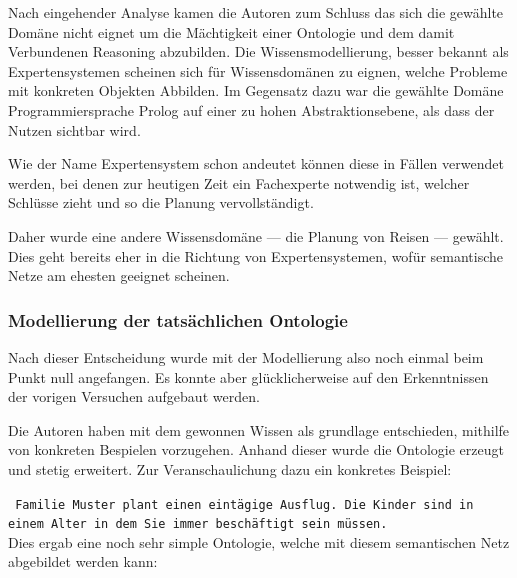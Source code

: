 Nach eingehender Analyse kamen die Autoren zum Schluss das sich die gewählte Domäne nicht eignet um die Mächtigkeit einer Ontologie und dem damit Verbundenen Reasoning abzubilden. Die Wissensmodellierung, besser bekannt als Expertensystemen scheinen sich für Wissensdomänen zu eignen, welche Probleme mit konkreten Objekten Abbilden. Im Gegensatz dazu war die gewählte Domäne Programmiersprache Prolog auf einer zu hohen Abstraktionsebene, als dass der Nutzen sichtbar wird. 

Wie der Name Expertensystem schon andeutet können diese in Fällen verwendet werden,  bei denen zur heutigen Zeit ein Fachexperte notwendig ist, welcher Schlüsse zieht und so die Planung vervollständigt.

Daher wurde eine andere Wissensdomäne --- die Planung von Reisen --- gewählt. Dies geht bereits eher in die Richtung von Expertensystemen, wofür semantische Netze am ehesten geeignet scheinen.

\subsubsection{Modellierung der tatsächlichen Ontologie}
\label{sub:modellierung_der_ontologie_tatsaechliche}

Nach dieser Entscheidung wurde mit der Modellierung also noch einmal beim Punkt null angefangen. Es konnte aber glücklicherweise auf den Erkenntnissen der vorigen Versuchen aufgebaut werden.  

Die Autoren haben mit dem gewonnen Wissen als grundlage entschieden, mithilfe von konkreten Bespielen vorzugehen. Anhand dieser wurde die Ontologie erzeugt und stetig erweitert. Zur Veranschaulichung dazu ein konkretes Beispiel:

\texttt{ Familie Muster plant einen eintägige Ausflug. Die Kinder sind in einem Alter in dem Sie immer beschäftigt sein müssen.}\\

Dies ergab eine noch sehr simple Ontologie, welche mit diesem semantischen Netz abgebildet werden kann:

